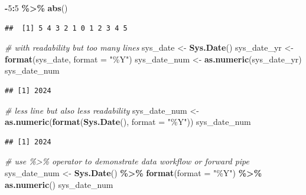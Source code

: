 \documentclass[
]{book}
\newenvironment{Shaded}{\begin{snugshade}}{\end{snugshade}}
\newcommand{\AttributeTok}[1]{\textcolor[rgb]{0.13,0.29,0.53}{#1}}
\newcommand{\CommentTok}[1]{\textcolor[rgb]{0.56,0.35,0.01}{\textit{#1}}}
\newcommand{\DecValTok}[1]{\textcolor[rgb]{0.00,0.00,0.81}{#1}}
\newcommand{\FunctionTok}[1]{\textcolor[rgb]{0.13,0.29,0.53}{\textbf{#1}}}
\newcommand{\NormalTok}[1]{#1}
\newcommand{\OtherTok}[1]{\textcolor[rgb]{0.56,0.35,0.01}{#1}}
\newcommand{\SpecialCharTok}[1]{\textcolor[rgb]{0.81,0.36,0.00}{\textbf{#1}}}
\newcommand{\StringTok}[1]{\textcolor[rgb]{0.31,0.60,0.02}{#1}}
\theoremstyle{definition}
\theoremstyle{definition}
\theoremstyle{definition}
\theoremstyle{definition}
\theoremstyle{remark}
\begin{document}
\begin{Shaded}
\begin{Highlighting}[]
\SpecialCharTok{{-}}\DecValTok{5}\SpecialCharTok{:}\DecValTok{5} \SpecialCharTok{\%\textgreater{}\%} \FunctionTok{abs}\NormalTok{()}
\end{Highlighting}
\end{Shaded}

\begin{verbatim}
##  [1] 5 4 3 2 1 0 1 2 3 4 5
\end{verbatim}

\begin{Shaded}
\begin{Highlighting}[]
\CommentTok{\# with readability but too many lines}
\NormalTok{sys\_date }\OtherTok{\textless{}{-}} \FunctionTok{Sys.Date}\NormalTok{()}
\NormalTok{sys\_date\_yr }\OtherTok{\textless{}{-}} \FunctionTok{format}\NormalTok{(sys\_date, }\AttributeTok{format =} \StringTok{"\%Y"}\NormalTok{)}
\NormalTok{sys\_date\_num }\OtherTok{\textless{}{-}} \FunctionTok{as.numeric}\NormalTok{(sys\_date\_yr)}
\NormalTok{sys\_date\_num}
\end{Highlighting}
\end{Shaded}

\begin{verbatim}
## [1] 2024
\end{verbatim}

\begin{Shaded}
\begin{Highlighting}[]
\CommentTok{\# less line but also less readability}
\NormalTok{sys\_date\_num }\OtherTok{\textless{}{-}} \FunctionTok{as.numeric}\NormalTok{(}\FunctionTok{format}\NormalTok{(}\FunctionTok{Sys.Date}\NormalTok{(), }\AttributeTok{format =} \StringTok{"\%Y"}\NormalTok{))}
\NormalTok{sys\_date\_num}
\end{Highlighting}
\end{Shaded}

\begin{verbatim}
## [1] 2024
\end{verbatim}

\begin{Shaded}
\begin{Highlighting}[]
\CommentTok{\# use \%\textgreater{}\% operator to demonstrate data workflow or forward pipe}
\NormalTok{sys\_date\_num }\OtherTok{\textless{}{-}} \FunctionTok{Sys.Date}\NormalTok{() }\SpecialCharTok{\%\textgreater{}\%}
   \FunctionTok{format}\NormalTok{(}\AttributeTok{format =} \StringTok{"\%Y"}\NormalTok{) }\SpecialCharTok{\%\textgreater{}\%}
   \FunctionTok{as.numeric}\NormalTok{()}
\NormalTok{sys\_date\_num}
\end{Highlighting}
\end{Shaded}
\end{document}
